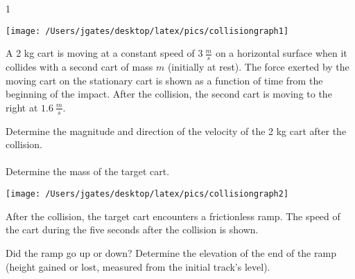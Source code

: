 
\AddToShipoutPicture*{\BackgroundPic}

\addtocounter {ProbNum} {1}

\begin{floatingfigure}[r]{.44\textwidth}
\texttt{[image: /Users/jgates/desktop/latex/pics/collisiongraph1]}
\end{floatingfigure}
 
{\bf \Large{}} A 2 kg cart is moving at a constant speed of ${3~\tfrac{m}{s}}$ on a horizontal surface when it collides with a second cart of mass $m$ (initially at rest). The force exerted by the moving cart on the stationary cart is shown as a function of time from the beginning of the impact. After the collision, the second cart is moving to the right at ${1.6~\tfrac{m}{s}}$.\bigskip

Determine the magnitude and direction of the velocity of the 2 kg cart after the collision. \paragraph{}
\noindent
\vfill

Determine the mass of the target cart.
\vfill

\begin{floatingfigure}[r]{.45\textwidth}
\texttt{[image: /Users/jgates/desktop/latex/pics/collisiongraph2]}
\end{floatingfigure}
After the collision, the target cart encounters a frictionless ramp. The speed of the cart during the five seconds after the collision is shown.

\bigskip
Did the ramp go up or down? Determine the elevation of the end of the ramp (height gained or lost, measured from the initial track's level).

\vfill
\vfill
\newpage